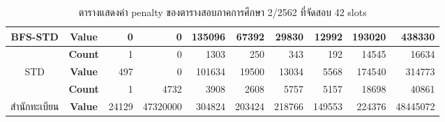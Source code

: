 \begin{table}[]
{\begin{tabular}{@{}ccrrrrrrrr@{}}
    \multirow{-2}{*}{BFS-STD}                    & \textbf{Value}                        & 0                          & 0                        & 135096                        & 67392                        & 29830                        & 12992                       & 193020                        & 438330                        \\ \midrule
    {\color[HTML]{FE0000} }                      & {\color[HTML]{FE0000} \textbf{Count}} & {\color[HTML]{FE0000} 1}   & {\color[HTML]{FE0000} 0} & {\color[HTML]{FE0000} 1303}   & {\color[HTML]{FE0000} 250}   & {\color[HTML]{FE0000} 343}   & {\color[HTML]{FE0000} 192}  & {\color[HTML]{FE0000} 14545}  & {\color[HTML]{FE0000} 16634}  \\ \cmidrule(l){2-10} 
    \multirow{-2}{*}{{\color[HTML]{FE0000} STD}} & {\color[HTML]{FE0000} \textbf{Value}} & {\color[HTML]{FE0000} 497} & {\color[HTML]{FE0000} 0} & {\color[HTML]{FE0000} 101634} & {\color[HTML]{FE0000} 19500} & {\color[HTML]{FE0000} 13034} & {\color[HTML]{FE0000} 5568} & {\color[HTML]{FE0000} 174540} & {\color[HTML]{FE0000} 314773} \\ \midrule
                                                 & \textbf{Count}                        & 1                          & 4732                     & 3908                          & 2608                         & 5757                         & 5157                        & 18698                         & 40861                         \\ \cmidrule(l){2-10} 
    \multirow{-2}{*}{สำนักทะเบียน}                  & \textbf{Value}                        & 24129                      & 47320000                 & 304824                        & 203424                       & 218766                       & 149553                      & 224376                        & 48445072                      \\ \bottomrule
    \end{tabular}%
    }
    \caption{ตารางแสดงค่า penalty ของตารางสอบภาคการศึกษา 2/2562 ที่จัดสอบ 42 slots}
    \label{tab:result_table_262}
\end{table}

